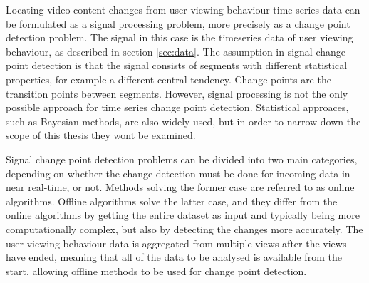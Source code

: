 Locating video content changes from user viewing behaviour time series data can be formulated as a signal processing problem, more precisely as a change point detection problem. %
The signal in this case is the timeseries data of user viewing behaviour, as described in section \ref{sec:data}. %
The assumption in signal change point detection is that the signal consists of segments with different statistical properties, for example a different central tendency. Change points are the transition points between segments. %
However, signal processing is not the only possible approach for time series change point detection. Statistical approaces, such as Bayesian methods, are also widely used, but in order to narrow down the scope of this thesis they wont be examined.

Signal change point detection problems can be divided into two main categories, depending on whether the change detection must be done for incoming data in near real-time, or not. Methods solving the former case are referred to as online algorithms. Offline algorithms solve the latter case, and they differ from the online algorithms by getting the entire dataset as input and typically being more computationally complex, but also by detecting the changes more accurately. The user viewing behaviour data is aggregated from multiple views after the views have ended, meaning that all of the data to be analysed is available from the start, allowing offline methods to be used for change point detection.

